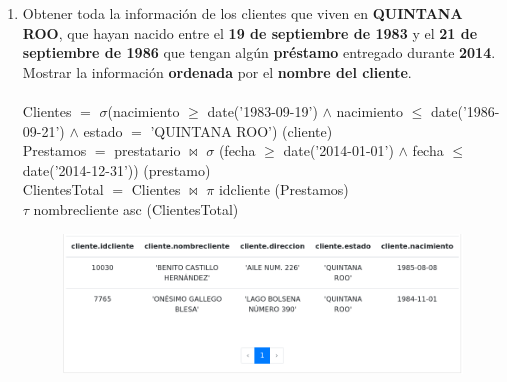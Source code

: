 \documentclass{exam}
\begin{document}
\begin{questions}
	\begin{enumerate}[label=\alph*.]
		\item Obtener toda la información de los clientes que viven en \textbf{QUINTANA ROO}, que hayan nacido entre el \textbf{19 de septiembre
de 1983} y el \textbf{21 de septiembre de 1986} que tengan algún \textbf{préstamo} entregado durante \textbf{2014}. Mostrar la información
\textbf{ordenada} por el \textbf{nombre del cliente}.\\\\
		Clientes $=$ $\sigma$(nacimiento $\geqslant$ date('1983-09-19') $\wedge$ nacimiento $\leqslant$ date('1986-09-21') $\wedge$ estado $=$ 'QUINTANA ROO') (cliente)\\
		Prestamos $=$ prestatario $\bowtie$ $\sigma$ (fecha $\geqslant$ date('2014-01-01') $\wedge$ fecha $\leqslant$ date('2014-12-31')) (prestamo)\\
		ClientesTotal $=$ Clientes $\bowtie$ $\pi$ idcliente (Prestamos)\\
		$\tau$ nombrecliente asc (ClientesTotal)\\
		\begin{center}
		\begin{figure}[h!]
			\includegraphics[width=17cm]{imgs/2a.png}
			\centering
		\end{figure}			
		\end{center}



\end{enumerate}
\end{questions}
\end{document}
